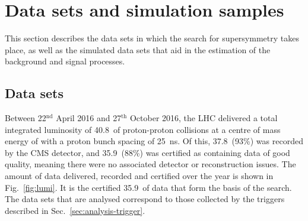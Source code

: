 


\section{Data sets and simulation samples}
\label{sec:analysis-samples}
This section describes the data sets in which the search for supersymmetry  
takes place, as well as the simulated data sets that aid in the estimation of 
the background and signal processes.


\subsection{Data sets}
\label{sec:analysis-samples-data}

Between 22$^\mathrm{nd}$ April 2016 and 27$^\mathrm{th}$ October 2016, the 
LHC delivered a total integrated luminosity of 40.8~\ifb of proton-proton 
collisions at a centre of mass energy of \com with a proton bunch spacing of 
25~ns. Of this, 37.8~\ifb (93\%) was recorded by the CMS detector, and 
35.9~\ifb (88\%) was certified as containing data of good quality, meaning 
there were no associated detector or reconstruction issues. The amount of data 
delivered, recorded and certified over the year is shown in 
Fig.~\ref{fig:lumi}.
It is the certified 35.9~\ifb of data that form the basis of the search. The 
data sets that are analysed correspond to those collected by the triggers 
described in Sec.~\ref{sec:analysis-trigger}.

